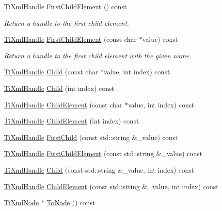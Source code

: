 \begin{DoxyCompactItemize}
\hyperlink{class_ti_xml_handle}{Ti\-Xml\-Handle} \hyperlink{class_ti_xml_handle_a24d1112e995e937e4dddb202d4113d4a}{First\-Child\-Element} () const 
\begin{DoxyCompactList}\small\item\em Return a handle to the first child element. \end{DoxyCompactList}\item 
\hyperlink{class_ti_xml_handle}{Ti\-Xml\-Handle} \hyperlink{class_ti_xml_handle_af0aea751320f5e430fac6f8fff3b8dd4}{First\-Child\-Element} (const char $\ast$value) const 
\begin{DoxyCompactList}\small\item\em Return a handle to the first child element with the given name. \end{DoxyCompactList}\item 
\hyperlink{class_ti_xml_handle}{Ti\-Xml\-Handle} \hyperlink{class_ti_xml_handle_a072492b4be1acdb0db2d03cd8f71ccc4}{Child} (const char $\ast$value, int index) const 
\item 
\hyperlink{class_ti_xml_handle}{Ti\-Xml\-Handle} \hyperlink{class_ti_xml_handle_af9cf6a7d08a5da94a8924425ad0cd5ac}{Child} (int index) const 
\item 
\hyperlink{class_ti_xml_handle}{Ti\-Xml\-Handle} \hyperlink{class_ti_xml_handle_a979a3f850984a176ee884e394c7eed2d}{Child\-Element} (const char $\ast$value, int index) const 
\item 
\hyperlink{class_ti_xml_handle}{Ti\-Xml\-Handle} \hyperlink{class_ti_xml_handle_a8786475b9d1f1518492e3a46704c7ef0}{Child\-Element} (int index) const 
\item 
\hyperlink{class_ti_xml_handle}{Ti\-Xml\-Handle} \hyperlink{class_ti_xml_handle_a8b10982dd39e74f3b068ca8952282d8a}{First\-Child} (const std\-::string \&\-\_\-value) const 
\item 
\hyperlink{class_ti_xml_handle}{Ti\-Xml\-Handle} \hyperlink{class_ti_xml_handle_a743f1e9cc18b5658c158ed5c0c165354}{First\-Child\-Element} (const std\-::string \&\-\_\-value) const 
\item 
\hyperlink{class_ti_xml_handle}{Ti\-Xml\-Handle} \hyperlink{class_ti_xml_handle_a5c4617db96789e9a5581dd5c12cdd287}{Child} (const std\-::string \&\-\_\-value, int index) const 
\item 
\hyperlink{class_ti_xml_handle}{Ti\-Xml\-Handle} \hyperlink{class_ti_xml_handle_a2e5f7758156e6b29a8e7a423eca2cf5b}{Child\-Element} (const std\-::string \&\-\_\-value, int index) const 
\item 
\hyperlink{class_ti_xml_node}{Ti\-Xml\-Node} $\ast$ \hyperlink{class_ti_xml_handle_af678e5088e83be67baf76f699756f2c3}{To\-Node} () const 

\end{DoxyCompactItemize}
